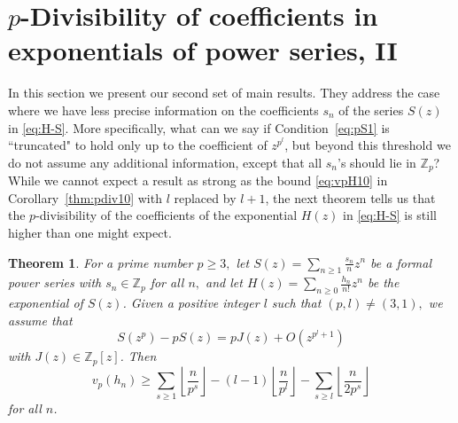 \documentclass[12pt,reqno]{amsart}
\numberwithin{equation}{section}
\newtheorem{theorem}{Theorem}
\theoremstyle{remark}
\begin{document}
\section{$p$-Divisibility of coefficients in exponentials of
  power series, II} \label{sec:pdiv2}

\noindent In this section we present our second set of 
main results. They address the case where we have less precise
information on the coefficients $s_n$ of the series $S(z)$
in \eqref{eq:H-S}. More specifically, what can we say if 
Condition~\eqref{eq:pS1} is ``truncated" to hold only up to the
coefficient of $z^{p^{l}}$, but beyond this threshold
we do not assume any additional
information, except that all $s_n$'s should lie in ${\mathbb{Z}}_p$?
While we cannot expect a result as strong as the bound \eqref{eq:vpH10}
in Corollary~\ref{thm:pdiv10} with $l$ replaced by $l+1$, 
the next theorem tells us that the
$p$-divisibility of the coefficients of the exponential $H(z)$ in
\eqref{eq:H-S} is still higher than one might expect.

\begin{theorem} \label{thm:pdiv2}
For a prime number $p\ge3,$
let\/ $S(z)=\sum_{n\ge1}\frac {s_n} {n}z^n$ be a formal power series
with $s_n\in{\mathbb{Z}}_p$ for all $n,$ and let 
$H(z)=\sum_{n\ge0}\frac {h_n} {n!}z^n$ be the exponential of $S(z)$.
Given a positive integer $l$
such that $(p,l)\ne(3,1),$ we assume that
\begin{equation} \label{eq:pS2}
S(z^{p})-pS(z)=pJ(z)
+O\left(z^{p^{l}+1}\right) 
\end{equation}
with $J(z)\in {\mathbb{Z}}_p[z]$.
Then
\begin{equation} \label{eq:vpH2}
v_p(h_n)\ge \sum_{s \ge 1}{\left\lfloor{\frac {n} {p^{s}}}\right\rfloor} 
-(l-1){\left\lfloor{\frac {n} {p^l}}\right\rfloor}-\sum_{s \ge l}{\left\lfloor{\frac {n} {2p^{s}}}\right\rfloor} 
\end{equation}
for all $n$.
\end{theorem}
\end{document}
